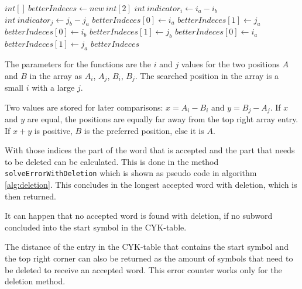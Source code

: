 \documentclass[a4paper, 11pt]{article}
\begin{document}
\begin{center}
\label{alg:fbi}
\begin{algorithmic}[1]
\State $int[] \ betterIndeces \gets new \ int[2]$
\State $int \  indicator_i \gets i_a - i_b$
\State $int \ indicator_j \gets j_b - j_a$
\State {}
\State $betterIndeces[0] \gets i_a$
\State $betterIndeces[1] \gets j_a$
\EndIf
{}
\State {}
\State $betterIndeces[0] \gets i_b$
\State $betterIndeces[1] \gets j_b$
\Else
\State {}
\State $betterIndeces[0] \gets i_a$
\State $betterIndeces[1] \gets j_a$
\EndIf
\State \Return $betterIndeces$
\end{algorithmic}
\hrulefill
\end{center}


The parameters for the functions are the $i$ and $j$ values for the two positions $A$ and $B$ in the array as $A_i$, $A_j$, $B_i$, $B_j$. The searched position in the array is a small $i$ with a large $j$.

Two values are stored for later comparisons: $x = A_i - B_i$ and $y = B_j-A_j$. If $x$ and $y$ are equal, the positions are equally far away from the top right array entry. If $x+y$ is positive, $B$ is the preferred position, else it is $A$.


With those indices the part of the word that is accepted and the part that needs to be deleted can be calculated. This is done in the method \texttt{solveErrorWithDeletion} which is shown as pseudo code in algorithm \ref{alg:deletion}. This concludes in the longest accepted word with deletion, which is then returned.

It can happen that no accepted word is found with deletion, if no subword concluded into the start symbol in the CYK-table.

The distance of the entry in the CYK-table that contains the start symbol and the top right corner can also be returned as the amount of symbols that need to be deleted to receive an accepted word. This error counter works only for the deletion method.
\end{document}
